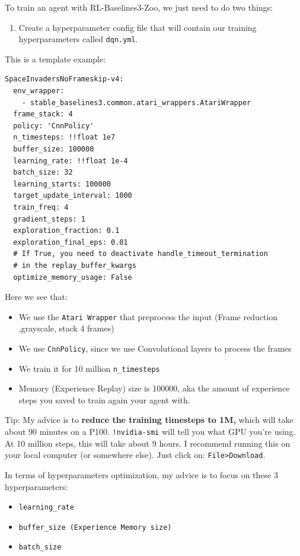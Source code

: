 \documentclass[11pt,a4paper]{article}
\begin{document}
To train an agent with RL-Baselines3-Zoo, we just need to do two things:

\begin{enumerate}
\def\labelenumi{\arabic{enumi}.}
\tightlist
\item
  Create a hyperparameter config file that will contain our training hyperparameters called \texttt{dqn.yml}.
\end{enumerate}

This is a template example:

\begin{lstlisting}
SpaceInvadersNoFrameskip-v4:
  env_wrapper:
    - stable_baselines3.common.atari_wrappers.AtariWrapper
  frame_stack: 4
  policy: 'CnnPolicy'
  n_timesteps: !!float 1e7
  buffer_size: 100000
  learning_rate: !!float 1e-4
  batch_size: 32
  learning_starts: 100000
  target_update_interval: 1000
  train_freq: 4
  gradient_steps: 1
  exploration_fraction: 0.1
  exploration_final_eps: 0.01
  # If True, you need to deactivate handle_timeout_termination
  # in the replay_buffer_kwargs
  optimize_memory_usage: False
\end{lstlisting}

Here we see that:

\begin{itemize}
\tightlist
\item
  We use the \texttt{Atari\ Wrapper} that preprocess the input (Frame reduction ,grayscale, stack 4 frames)
\item
  We use \texttt{CnnPolicy}, since we use Convolutional layers to process the frames
\item
  We train it for 10 million \texttt{n\_timesteps}
\item
  Memory (Experience Replay) size is 100000, aka the amount of experience steps you saved to train again your agent with.
\end{itemize}

Tip: My advice is to \textbf{reduce the training timesteps to 1M,} which will take about 90 minutes on a P100. \texttt{!nvidia-smi} will tell you what GPU you're using. At 10 million steps, this will take about 9 hours. I recommend running this on your local computer (or somewhere else). Just click on: \texttt{File\textgreater{}Download}.

In terms of hyperparameters optimization, my advice is to focus on these 3 hyperparameters:

\begin{itemize}
\tightlist
\item
  \texttt{learning\_rate}
\item
  \texttt{buffer\_size\ (Experience\ Memory\ size)}
\item
  \texttt{batch\_size}
\end{itemize}
\end{document}
